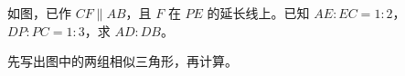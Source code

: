 \documentclass{exam-zh}
\begin{document}
\begin{problem}[points=10]
  \noindent
  \begin{minipage}[t]{\dimexpr\linewidth-60mm-6mm\relax}
    \vspace{0pt}
    如图，已作 $CF\parallel AB$，且 $F$ 在 $PE$ 的延长线上。已知 $AE:EC=1:2$，$DP:PC=1:3$，求 $AD:DB$。

先写出图中的两组相似三角形，再计算。


  \end{minipage}\hfill
  \begin{diagramcoltikz}{60mm}{第 3 题图}
  }
  \end{diagramcoltikz}
  \par\medskip
  \answerarea[38mm]
\end{problem}
\end{document}
